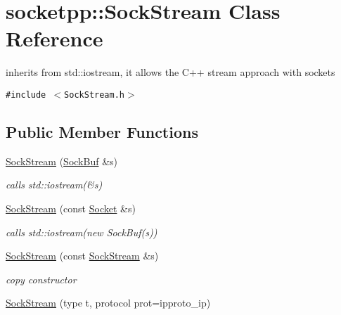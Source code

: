 \hypertarget{classsocketpp_1_1SockStream}{
\section{socketpp::SockStream Class Reference}
\label{classsocketpp_1_1SockStream}
}
inherits from std::iostream, it allows the C++ stream approach with sockets  


{\tt \#include $<$SockStream.h$>$}

\subsection*{Public Member Functions}
\begin{CompactItemize}
\item 
\hypertarget{classsocketpp_1_1SockStream_11fbfc7bda45c178c6e09ac6d67512fd}{
\hyperlink{classsocketpp_1_1SockStream_11fbfc7bda45c178c6e09ac6d67512fd}{SockStream} (\hyperlink{classsocketpp_1_1SockBuf}{SockBuf} \&s)}
\label{classsocketpp_1_1SockStream_11fbfc7bda45c178c6e09ac6d67512fd}

\begin{CompactList}\small\item\em calls std::iostream(\&s) \item\end{CompactList}\item 
\hypertarget{classsocketpp_1_1SockStream_704f4e77af424bd0638e736653e2d1b3}{
\hyperlink{classsocketpp_1_1SockStream_704f4e77af424bd0638e736653e2d1b3}{SockStream} (const \hyperlink{classsocketpp_1_1Socket}{Socket} \&s)}
\label{classsocketpp_1_1SockStream_704f4e77af424bd0638e736653e2d1b3}

\begin{CompactList}\small\item\em calls std::iostream(new SockBuf(s)) \item\end{CompactList}\item 
\hypertarget{classsocketpp_1_1SockStream_0310cdd1f212beec6b686d0a549f1788}{
\hyperlink{classsocketpp_1_1SockStream_0310cdd1f212beec6b686d0a549f1788}{SockStream} (const \hyperlink{classsocketpp_1_1SockStream}{SockStream} \&s)}
\label{classsocketpp_1_1SockStream_0310cdd1f212beec6b686d0a549f1788}

\begin{CompactList}\small\item\em copy constructor \item\end{CompactList}\item 
\hypertarget{classsocketpp_1_1SockStream_4baa8d20dd73480832c7dd9cbad15f75}{
\hyperlink{classsocketpp_1_1SockStream_4baa8d20dd73480832c7dd9cbad15f75}{SockStream} (type t, protocol prot=ipproto\_\-ip)}
\label{classsocketpp_1_1SockStream_4baa8d20dd73480832c7dd9cbad15f75}


\end{CompactItemize}
